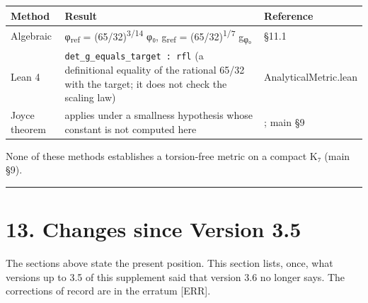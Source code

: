 \documentclass[11pt,a4paper]{article}
\begin{document}
\begin{longtable}[]{@{}
  >{\raggedright\arraybackslash}p{}
  >{\raggedright\arraybackslash}p{}
  >{\raggedright\arraybackslash}p{}@{}}
\toprule\noalign{}
\begin{minipage}[b]{\linewidth}\raggedright
Method
\end{minipage} & \begin{minipage}[b]{\linewidth}\raggedright
Result
\end{minipage} & \begin{minipage}[b]{\linewidth}\raggedright
Reference
\end{minipage} \\
\midrule\noalign{}
\endhead
\bottomrule\noalign{}
\endlastfoot
Algebraic & φ\textsubscript{ref} = (65/32)\textsuperscript{3/14} φ₀, g\textsubscript{ref} = (65/32)\textsuperscript{1/7} g\textsubscript{φ₀} & §11.1 \\
Lean 4 & \texttt{det\_\allowbreak{}g\_\allowbreak{}equals\_\allowbreak{}target\ :\ rfl} (a definitional equality of the rational 65/32 with the target; it does not check the scaling law) & AnalyticalMetric.lean \\
Joyce theorem & applies under a smallness hypothesis whose constant is not computed here & \cite{20}; main §9 \\
\end{longtable}

None of these methods establishes a torsion-free metric on a compact K₇ (main §9).

\begin{center}\rule{\linewidth}{0.5pt}\end{center}

\section{13. Changes since Version 3.5}\label{changes-since-version-3.5}

The sections above state the present position. This section lists, once, what versions up to 3.5 of this supplement said that version 3.6 no longer says. The corrections of record are in the erratum {[}ERR{]}.
\end{document}
